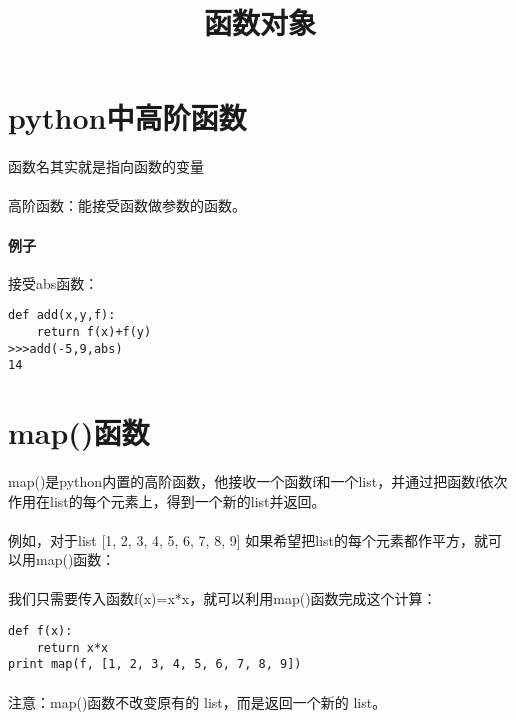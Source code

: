\documentclass{article}
\begin{document}
\begin{CJK}{UTF8}{gbsn}
\title{函数对象}
\date{}
\maketitle
\section{python中高阶函数}
\paragraph{}
函数名其实就是指向函数的变量
\paragraph{}
高阶函数：能接受函数做参数的函数。	
\paragraph{例子}
接受abs函数：		
\begin{verbatim}
def add(x,y,f):
    return f(x)+f(y)
>>>add(-5,9,abs)
14
\end{verbatim}
\section{map()函数}
\paragraph{}
map()是python内置的高阶函数，他接收一个函数f和一个list，并通过把函数f依次作用在list的每个元素上，得到一个新的list并返回。
\paragraph{}
例如，对于list [1, 2, 3, 4, 5, 6, 7, 8, 9]
如果希望把list的每个元素都作平方，就可以用map()函数：
\paragraph{}
我们只需要传入函数f(x)=x*x，就可以利用map()函数完成这个计算：
\begin{verbatim}
def f(x):
    return x*x
print map(f, [1, 2, 3, 4, 5, 6, 7, 8, 9])
\end{verbatim}
\paragraph{}
注意：map()函数不改变原有的 list，而是返回一个新的 list。

\end{CJK}
\end{document}
